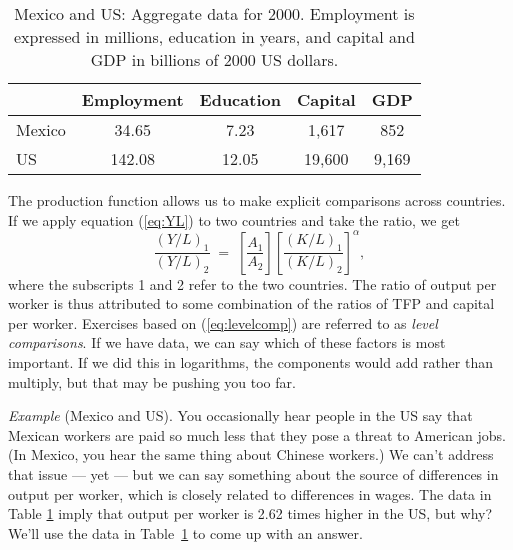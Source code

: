\documentclass[letterpaper,12pt]{article}
\begin{document}
\begin{table}[b]
\begin{center}
\begin{tabular}{lcccc}
\toprule 
                &   Employment   & Education & Capital  & GDP \\%
\midrule 
Mexico          &     34.65    &    7.23    &  1,617   &  852 \\%
US              &    142.08    &    12.05   & 19,600   &  9,169 \\%
\bottomrule 
\end{tabular}
\end{center}
\caption{Mexico and US:  Aggregate data for 2000.
Employment is expressed in millions, education in years,
and capital and GDP in billions of 2000 US dollars.}
\label{tab:mexus}
\end{table}


The production function allows us to make explicit
comparisons across countries.  If we apply equation (\ref{eq:YL})
to two countries  and take the ratio, we get
\begin{equation}
    \frac{(Y/L)_1}{(Y/L)_2} \;=\;
             \left[ \frac{A_1}{A_2} \right]
             \left[ \frac{(K/L)_1}{(K/L)_2} \right]^\alpha ,
        \label{eq:levelcomp}
\end{equation}
where the subscripts 1 and 2 refer to the two countries.
The ratio of output per worker is thus attributed to
some combination of the ratios of
TFP and capital per worker.
Exercises based on (\ref{eq:levelcomp}) are referred to as
{\it level comparisons\/}.
If we have data, we can say which of these factors is most important.
If we did this in logarithms, the components would add rather than multiply,
but that may be pushing you too far.


{\it Example\/} (Mexico and US). You occasionally hear
people in the US say that Mexican workers are paid so much less
that they pose a threat to American jobs. (In Mexico, you hear the
same thing about Chinese workers.) We can't address that issue ---
yet --- but we can say something about the source of differences
in output per worker, which is closely related to differences in
wages. The data in Table \ref{tab:mexus} imply that output per
worker is 2.62 times higher in the US, but why?
We'll use the data in Table~\ref{tab:mexus} to come up with an answer.
\end{document}

